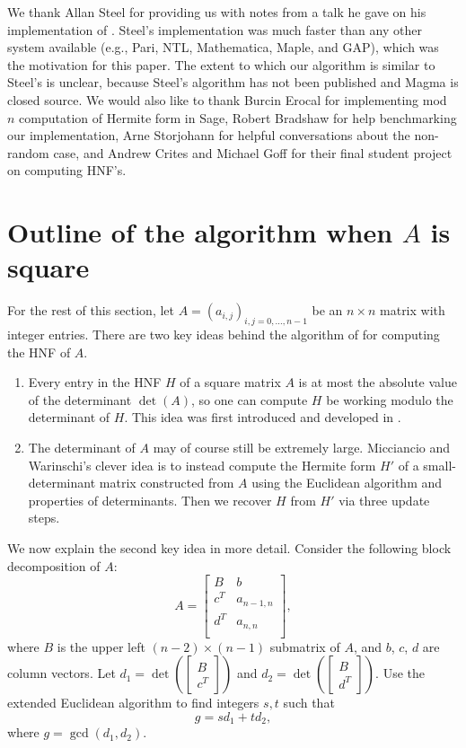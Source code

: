 \documentclass[preprint,12pt]{elsarticle}
\theoremstyle{plain}
\theoremstyle{definition}
\numberwithin{equation}{section}
\numberwithin{figure}{section}
\numberwithin{table}{section}
\begin{document}
\vspace{2ex}\par{} We thank Allan Steel
for providing us with notes from a talk he gave on his implementation
of \cite{MicWar01}.  Steel's implementation was much faster than any
other system available (e.g., Pari, NTL, Mathematica, Maple, and GAP),
which was the motivation for this paper.  The extent to which our
algorithm is similar to Steel's is unclear, because Steel's algorithm
has not been published and Magma is closed source.  We would also like
to thank Burcin Erocal for implementing mod~$n$ computation of Hermite
form in Sage, Robert Bradshaw for help benchmarking our
implementation, Arne Storjohann for helpful conversations about the
non-random case, and Andrew Crites and Michael Goff for their final
student project on computing HNF's.


\section{Outline of the algorithm when $A$ is square}
\label{sec:outline}

For the rest of this section, let $A=(a_{i,j})_{i,j=0,\ldots,n-1}$ be
an $n\times n$ matrix with integer entries.  There are two key ideas
behind the algorithm of \cite{MicWar01} for computing the HNF of $A$.
\begin{enumerate}
\item Every entry in the HNF $H$ of a square matrix $A$ is at
  most the absolute value of the determinant $\det(A)$, so one can compute $H$
  be working modulo the determinant of $H$. This idea was first
  introduced and developed in \cite{DomKan87}.
\item The determinant of $A$ may of course still be extremely large.
  Micciancio and Warinschi's clever idea is to instead compute the
  Hermite form $H'$ of a small-determinant matrix constructed from $A$
  using the Euclidean algorithm and properties of determinants.  Then
  we recover $H$ from $H'$ via three update steps.
\end{enumerate}

We now explain the second key idea in more detail.  Consider the following
block decomposition of $A$:
$$
A = 
\begin{bmatrix}
  B & b\\
  c^T & a_{n-1,n}\\
  d^T & a_{n,n}\\
\end{bmatrix},
$$     
 where $B$ is the upper left $(n-2)\times
(n-1)$ submatrix of $A$, and $b$, $c$, $d$ are column vectors.
Let 
$d_1 = \det \left(
\begin{bmatrix}
  B\\c^T
\end{bmatrix}
\right)$
and 
 $d_2 = \det \left(
      \begin{bmatrix}
        B\\d^T
      \end{bmatrix}
      \right)
$.
Use the extended Euclidean algorithm to find integers $s,t$ such that
$$
  g = sd_1+td_2,
$$
where $g=\gcd(d_1, d_2)$.
\end{document}
